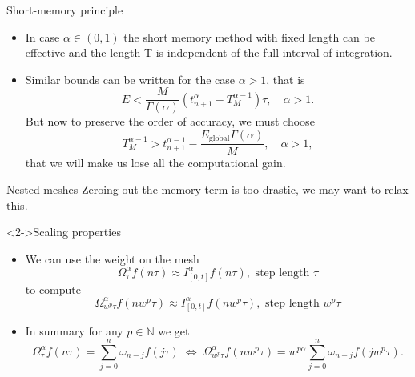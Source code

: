 \documentclass[aspectratio=169,xcolor=dvipsnames]{beamer}
\begin{document}
\begin{frame}{Short-memory principle~\parencite{FordSpeedAccuracy}}

\begin{itemize}
	\item[\faSmile]<1-> In case $\alpha \in (0,1)$ the short memory method with fixed length can be effective and the length T is independent of the full
	interval of integration.
	\item[\faSadTear]<2-> Similar bounds can be written for the case $\alpha > 1$, that is
	\[
	E < \frac{M}{\Gamma(\alpha)} (t_{n+1}^\alpha - T_M^{\alpha-1})\tau, \quad \alpha > 1.
	\]
	But now to preserve the order of accuracy, we must choose
	\[
	T_M^{\alpha - 1} > t_{n+1}^{\alpha-1} - \frac{E_{\text{global}} \Gamma(\alpha)}{M}, \quad \alpha > 1,
	\]
	that we will make us lose all the computational gain.
\end{itemize}


\end{frame}

\begin{frame}{Nested meshes}
Zeroing out the memory term is too drastic, we may want to relax this.

\begin{exampleblock}<2->{Scaling properties}
\only<2>{\[I^{\alpha}_{[0,t]} 
	f(t) = \int_{0}^{t} 
	\frac{f(\tau)}{(t-\tau)^{1-\alpha}}\,\textrm{d}\tau\]}
\only<3>{\[
	I^{\alpha}_{[0,t]} f(w t) = \int_{0}^{t} \frac{f(\tau)}{(wt-\tau)^{1-\alpha}}\,\textrm{d}\tau\]}
\only<4>{\[
	I^{\alpha}_{[0,t]} f(w t) = w^\alpha \int_{0}^{t} \frac{f(w\tau)}{(t-\tau)^{1-\alpha}}\,\textrm{d}\tau\]}
\end{exampleblock}
\begin{itemize}
	\item[\faLightbulb]<6-> We can use the weight on the mesh \[\Omega_\tau^\alpha f(n\tau) \approx I^{\alpha}_{[0,t]} f(n\tau), \text{ step length }\tau\] to compute
	\[
	\Omega^\alpha_{w^p \tau} f(n w^p \tau) \approx I^{\alpha}_{[0,t]} f(nw^p\tau), \text{ step length } w^p \tau
	\]
	\item<7-> In summary for any $p \in \mathbb{N}$ we get\vspace{-0.5em}
	\[
	\Omega_\tau^{\alpha} f(n\tau) = \sum_{j=0}^n \omega_{n-j} f(j\tau) \;\Leftrightarrow\; \Omega^\alpha_{w^p \tau} f(n w^p \tau) = w^{p\alpha} \sum_{j=0}^n \omega_{n-j} f(j w^p \tau).
	\]
\end{itemize}

\end{frame}
\end{document}
